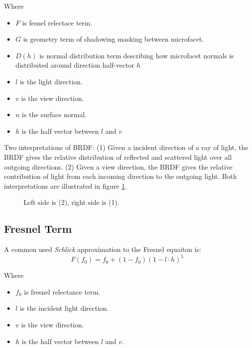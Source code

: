 \documentclass[12pt]{report}
\begin{document}
Where
\begin{itemize} 
\item{\(F\) is fesnel relectace term.}
\item{\(G\) is geometry term of shadowing masking between microfacet. }
\item{\(D(h)\) is normal distribution term describing how microfacet normals is distributed around direction half-vector \(h\)}
\item{\(l\) is the light direction. }
\item{\(v\) is the view direction. }
\item{\(n\) is the surface normal. } 
\item{\(h\) is the half vector between \(l\) and \(v\)} 
\end{itemize}

Two interpretations of BRDF: (1) Given a incident direction of a ray of light, the BRDF gives the relative distribution of reflected and scattered light over all outgoing directions. (2) Given a view direction, the BRDF gives the relative contribution of light from each incoming direction to the outgoing light. Both interpretations are illustrated in figure \ref{fig:brdf_interpretations}. 

\begin{figure}[htp]
    \centering
    \renewcommand{\thefigure}{\thechapter.\arabic{figure}}
    \caption[Microfacet]{Left side is (2), right side is (1).}
    \label{fig:brdf_interpretations}
\end{figure}


\subsection{Fresnel Term} 
A common used \emph{Schlick} approximation to the Fresnel equaiton is: 
\begin{equation}
F(f_{0}) = f_{0} + (1-f_{0})(1-l \cdot h)^{5}
\label{eq:schlick_fresnel}
\end{equation}

Where 
\begin{itemize}
\item{\(f_{0}\) is fresnel relectance term.}
\item{\(l\) is the incident light direction.}
\item{\(v\) is the view direction.} 
\item{\(h\) is the half vector between \(l\) and \(v\). } 
\end{itemize}
\end{document}
